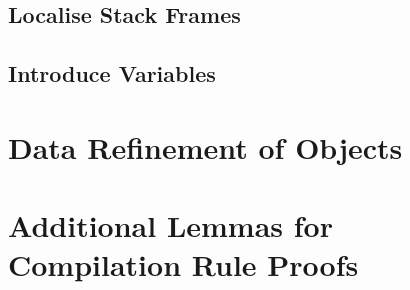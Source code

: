 

\pagebreak

\subsection{Localise Stack Frames}



\pagebreak

\subsection{Introduce Variables}



\pagebreak

\section{Data Refinement of Objects}



\pagebreak

\section{Additional Lemmas for Compilation Rule Proofs}

